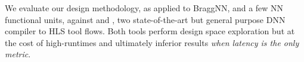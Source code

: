 We evaluate our design methodology, as applied to BraggNN, and a few NN functional units, against  and , two state-of-the-art but general purpose DNN compiler to HLS tool flows.
Both tools perform design space exploration but at the cost of high-runtimes and ultimately inferior results \emph{when latency is the only metric}.